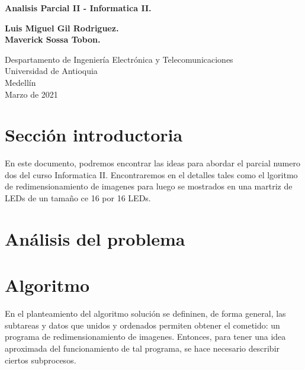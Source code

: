 \documentclass{article}
\begin{document}
\begin{titlepage}
    \begin{center}
        \vspace*{1cm}
            
        \Huge
        \textbf{Analisis Parcial II - Informatica II.}
            
        \vspace{0.5cm}
        \LARGE
            
        \vspace{1.5cm}
            
        \textbf{Luis Miguel Gil Rodriguez.}
        \\
        \textbf{Maverick Sossa Tobon.}
        \vfill
        \vspace{0.8cm}
            
        \Large
        Despartamento de Ingeniería Electrónica y Telecomunicaciones\\
        Universidad de Antioquia\\
        Medellín\\
        Marzo de 2021
            
    \end{center}
\end{titlepage}
\tableofcontents
\newpage
\section{Sección introductoria} \label{intro}
En este documento, podremos encontrar las ideas para abordar el parcial numero dos del curso Informatica II. Encontraremos en el detalles tales como el lgoritmo de redimensionamiento de imagenes para luego se mostrados en una martriz de LEDs de un tamaño ce 16 por 16 LEDs.
\section{Análisis del problema} \label{Analisis del problema}

\section{Algoritmo} \label{algoritmo}
En el planteamiento del algoritmo solución se defininen, de forma general, las subtareas y datos que unidos y ordenados permiten obtener el cometido: un programa de redimensionamiento de imagenes. Entonces, para tener una idea aproximada del funcionamiento de tal programa, se hace necesario describir ciertos subprocesos. 
\end{document}
